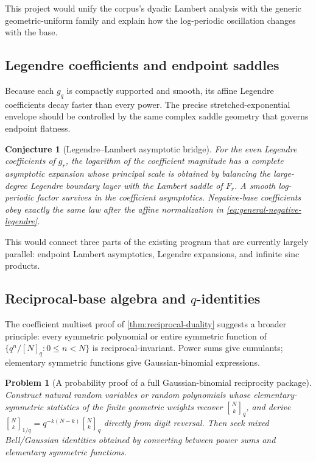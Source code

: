 \documentclass[11pt]{article}
\newtheorem{conjecture}[theorem]{Conjecture}
\newtheorem{problem}[theorem]{Problem}
\theoremstyle{definition}
\newcommand{\qbinom}[2]{\genfrac{[}{]}{0pt}{}{#1}{#2}}
\begin{document}
This project would unify the corpus's dyadic Lambert analysis with the generic
geometric-uniform family and explain how the log-periodic oscillation changes with the
base.

\subsection{Legendre coefficients and endpoint saddles}

Because each \(g_q\) is compactly supported and smooth, its affine Legendre coefficients
decay faster than every power.  The precise stretched-exponential envelope should be
controlled by the same complex saddle geometry that governs endpoint flatness.

\begin{conjecture}[Legendre--Lambert asymptotic bridge]\label{conj:legendre-lambert}
For the even Legendre coefficients of \(g_r\), the logarithm of the coefficient magnitude
has a complete asymptotic expansion whose principal scale is obtained by balancing the
large-degree Legendre boundary layer with the Lambert saddle of \(F_r\).  A smooth
log-periodic factor survives in the coefficient asymptotics.  Negative-base coefficients
obey exactly the same law after the affine normalization in
\cref{eq:general-negative-legendre}.
\end{conjecture}

This would connect three parts of the existing program that are currently largely
parallel: endpoint Lambert asymptotics, Legendre expansions, and infinite sinc products.

\subsection{Reciprocal-base algebra and $q$-identities}

The coefficient multiset proof of \cref{thm:reciprocal-duality} suggests a broader
principle: every symmetric polynomial or entire symmetric function of
\(\{q^n/[N]_q:0\le n<N\}\) is reciprocal-invariant.  Power sums give cumulants; elementary
symmetric functions give Gaussian-binomial expressions.

\begin{problem}[A probability proof of a full Gaussian-binomial reciprocity package]
Construct natural random variables or random polynomials whose elementary-symmetric
statistics of the finite geometric weights recover
\(\qbinom{N}{k}_q\), and derive
\(\qbinom{N}{k}_{1/q}=q^{-k(N-k)}\qbinom{N}{k}_q\) directly from digit reversal.  Then seek
mixed Bell/Gaussian identities obtained by converting between power sums and elementary
symmetric functions.
\end{problem}
\end{document}
